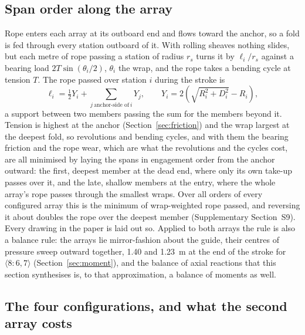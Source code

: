 \documentclass[preprint,12pt,number]{elsarticle}
\newcommand{\cfg}[2]{\langle #1,#2\rangle}
\begin{document}
\subsection{Span order along the array}
\label{sec:spanorder}

Rope enters each array at its outboard end and flows toward the anchor, so a fold is fed through every station outboard of it. With rolling sheaves nothing slides, but each metre of rope passing a station of radius $r_s$ turns it by $\ell_i / r_s$ against a bearing load $2T\sin(\theta_i/2)$, $\theta_i$ the wrap, and the rope takes a bending cycle at tension $T$. The rope passed over station $i$ during the stroke is
\begin{equation}
\ell_i = \tfrac{1}{2} Y_i + \sum_{j\ \text{anchor-side of}\ i} Y_j, \qquad Y_i = 2\left(\sqrt{R_i^2 + D_i^2} - R_i\right),
\label{eq:ropeflow}
\end{equation}
a support between two members passing the sum for the members beyond it. Tension is highest at the anchor (Section~\ref{sec:friction}) and the wrap largest at the deepest fold, so revolutions and bending cycles, and with them the bearing friction and the rope wear, which are what the revolutions and the cycles cost, are all minimised by laying the spans in engagement order from the anchor outward: the first, deepest member at the dead end, where only its own take-up passes over it, and the late, shallow members at the entry, where the whole array's rope passes through the smallest wraps. Over all orders of every configured array this is the minimum of wrap-weighted rope passed, and reversing it about doubles the rope over the deepest member (Supplementary Section~S9). Every drawing in the paper is laid out so. Applied to both arrays the rule is also a balance rule: the arrays lie mirror-fashion about the guide, their centres of pressure sweep outward together, 1.40 and 1.23~m at the end of the stroke for $\cfg{8{:}6}{7}$ (Section~\ref{sec:moment}), and the balance of axial reactions that this section synthesises is, to that approximation, a balance of moments as well.

\subsection{The four configurations, and what the second array costs}
\label{sec:configs}
\end{document}
